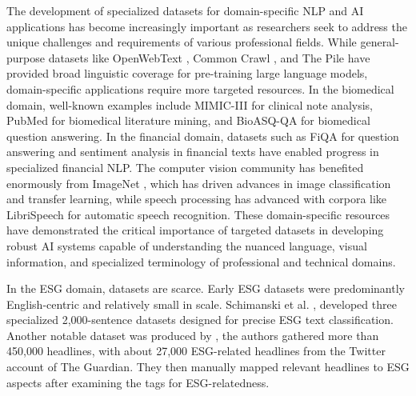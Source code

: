 \documentclass[12pt, letterpaper]{template}
\begin{document}
The development of specialized datasets for domain-specific NLP and AI applications has become increasingly important as researchers seek to address the unique challenges and requirements of various professional fields. While general-purpose datasets like OpenWebText \citep{openwebtext}, Common Crawl \citep{commoncrawl}, and The Pile \citep{thepile} have provided broad linguistic coverage for pre-training large language models, domain-specific applications require more targeted resources. In the biomedical domain, well-known examples include MIMIC-III \citep{mimic3} for clinical note analysis, PubMed\citep{pubmed} for biomedical literature mining, and BioASQ-QA \citep{bioasq-qa} for biomedical question answering. In the financial domain, datasets such as FiQA \citep{fiqa} for question answering and sentiment analysis in financial texts have enabled progress in specialized financial NLP. The computer vision community has benefited enormously from ImageNet \citep{imagenet}, which has driven advances in image classification and transfer learning, while speech processing has advanced with corpora like LibriSpeech \citep{librispeech} for automatic speech recognition. These domain-specific resources have demonstrated the critical importance of targeted datasets in developing robust AI systems capable of understanding the nuanced language, visual information, and specialized terminology of professional and technical domains. 

In the ESG domain, datasets are scarce. Early ESG datasets were predominantly English-centric and relatively small in scale. Schimanski et al. \citep{Tobias2024}, developed three specialized 2,000-sentence datasets designed for precise ESG text classification. Another notable dataset was produced by \citep{esgminer}, the authors gathered more than 450,000 headlines, with about 27,000 ESG-related headlines from the Twitter account of The Guardian. They then manually mapped relevant headlines to ESG aspects after examining the tags for ESG-relatedness.
\end{document}

